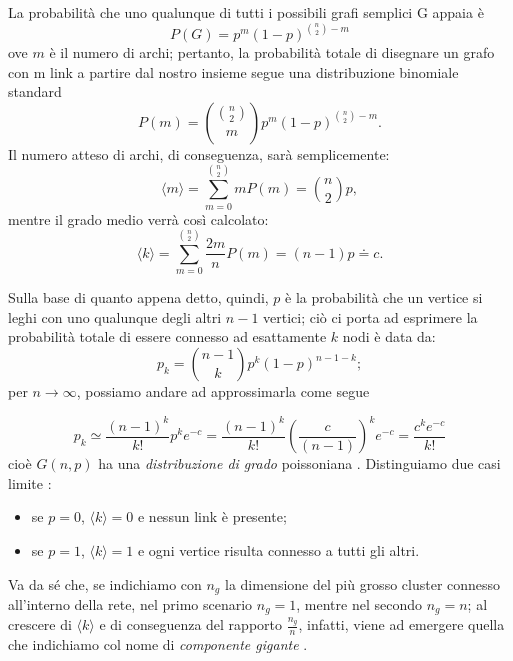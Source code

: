 La probabilità che uno qualunque di tutti i possibili grafi semplici G appaia è
\begin{equation}
P \left(G \right) = p^m \left( 1 - p \right)^{\binom{n}{2} - m}
\end{equation}
ove $ m $ è il numero di archi; pertanto, la probabilità totale di disegnare un grafo con m link a partire dal nostro insieme segue una distribuzione binomiale standard
\begin{equation}
P \left(m \right) = \binom{\binom{n}{2}}{m} p^m \left( 1 - p \right)^{\binom{n}{2} - m}.
\end{equation}
Il numero atteso di archi, di conseguenza, sarà semplicemente:
\begin{equation}
\langle m \rangle = \sum_{m=0}^{\binom{n}{2}} m P \left(m \right) = \binom{n}{2} p,
\end{equation}
mentre il grado medio verrà così calcolato:
\begin{equation}
\langle k \rangle = \sum_{m=0}^{{\binom{n}{2}}} \frac{2m}{n} P \left(m \right) = \left( n - 1 \right) p \doteq c.
\end{equation}

Sulla base di quanto appena detto, quindi, $ p $ è la probabilità che un vertice si leghi con uno qualunque degli altri $ n - 1 $ vertici; ciò ci porta ad esprimere la probabilità totale di essere connesso ad esattamente $ k $ nodi è data da:
\begin{equation}
p_k = \binom{n - 1}{k} p^k \left(1 - p \right)^{n - 1 - k};
\end{equation} 
per $ n \rightarrow \infty $, possiamo andare ad approssimarla come segue

\begin{equation}
p_k  \simeq \frac{ \left(n - 1 \right)^{k}}{k!} p^k e^{- c} = \frac{ \left(n - 1 \right)^{k}}{k!} \left( \frac{c}{ \left(n - 1 \right)} \right)^k e^{- c} = \frac{ c^k e^{- c}}{k!}
\end{equation}
cioè $ G \left(n,p \right) $ ha una \emph{distribuzione di grado} poissoniana \cite{Newman}. Distinguiamo due casi limite \cite{Barabasi}:
\begin{itemize}
\item se $ p = 0 $, $ \langle k \rangle = 0 $ e nessun link è presente; \\
\item se $ p = 1 $, $ \langle k \rangle = 1 $ e ogni vertice risulta connesso a tutti gli altri.
\end{itemize} 
Va da sé che, se indichiamo con $ n_g $ la dimensione del più grosso cluster connesso all'interno della rete, nel primo scenario $ n_g = 1 $, mentre nel secondo $ n_g = n $; al crescere di $ \langle k \rangle $ e di conseguenza del rapporto $ \frac{n_g}{n} $, infatti, viene ad emergere quella che indichiamo col nome di \emph{componente gigante} \cite{Erdos}.